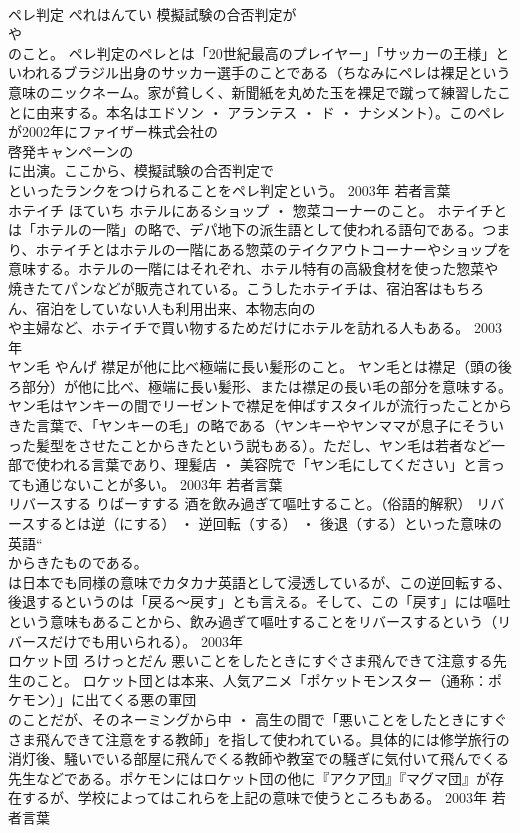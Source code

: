 \documentclass[8pt]{extreport}
\begin{document}
\begin{CJK}{UTF8}{min}
\\	ペレ判定	ぺれはんてい	模擬試験の合否判定が
\\	や
\\	のこと。	ペレ判定のペレとは「20世紀最高のプレイヤー」「サッカーの王様」といわれるブラジル出身のサッカー選手のことである（ちなみにペレは裸足という意味のニックネーム。家が貧しく、新聞紙を丸めた玉を裸足で蹴って練習したことに由来する。本名はエドソン ・ アランテス ・ ド ・ ナシメント）。このペレが2002年にファイザー株式会社の
\\	啓発キャンペーンの
\\	に出演。ここから、模擬試験の合否判定で
\\	といったランクをつけられることをペレ判定という。	2003年	若者言葉	
\\	ホテイチ	ほていち	ホテルにあるショップ ・ 惣菜コーナーのこと。	ホテイチとは「ホテルの一階」の略で、デパ地下の派生語として使われる語句である。つまり、ホテイチとはホテルの一階にある惣菜のテイクアウトコーナーやショップを意味する。ホテルの一階にはそれぞれ、ホテル特有の高級食材を使った惣菜や焼きたてパンなどが販売されている。こうしたホテイチは、宿泊客はもちろん、宿泊をしていない人も利用出来、本物志向の
\\	や主婦など、ホテイチで買い物するためだけにホテルを訪れる人もある。	2003年	
\\	ヤン毛	やんげ	襟足が他に比べ極端に長い髪形のこと。	ヤン毛とは襟足（頭の後ろ部分）が他に比べ、極端に長い髪形、または襟足の長い毛の部分を意味する。ヤン毛はヤンキーの間でリーゼントで襟足を伸ばすスタイルが流行ったことからきた言葉で、「ヤンキーの毛」の略である（ヤンキーやヤンママが息子にそういった髪型をさせたことからきたという説もある）。ただし、ヤン毛は若者など一部で使われる言葉であり、理髪店 ・ 美容院で「ヤン毛にしてください」と言っても通じないことが多い。	2003年	若者言葉	
\\	リバースする	りばーすする	酒を飲み過ぎて嘔吐すること。（俗語的解釈）	リバースするとは逆（にする） ・ 逆回転（する） ・ 後退（する）といった意味の英語“
\\	からきたものである。
\\	は日本でも同様の意味でカタカナ英語として浸透しているが、この逆回転する、後退するというのは「戻る～戻す」とも言える。そして、この「戻す」には嘔吐という意味もあることから、飲み過ぎて嘔吐することをリバースするという（リバースだけでも用いられる）。	2003年	
\\	ロケット団	ろけっとだん	悪いことをしたときにすぐさま飛んできて注意する先生のこと。	ロケット団とは本来、人気アニメ「ポケットモンスター（通称：ポケモン）」に出てくる悪の軍団
\\	のことだが、そのネーミングから中 ・ 高生の間で「悪いことをしたときにすぐさま飛んできて注意をする教師」を指して使われている。具体的には修学旅行の消灯後、騒いでいる部屋に飛んでくる教師や教室での騒ぎに気付いて飛んでくる先生などである。ポケモンにはロケット団の他に『アクア団』『マグマ団』が存在するが、学校によってはこれらを上記の意味で使うところもある。	2003年	若者言葉	

\end{CJK}
\end{document}
